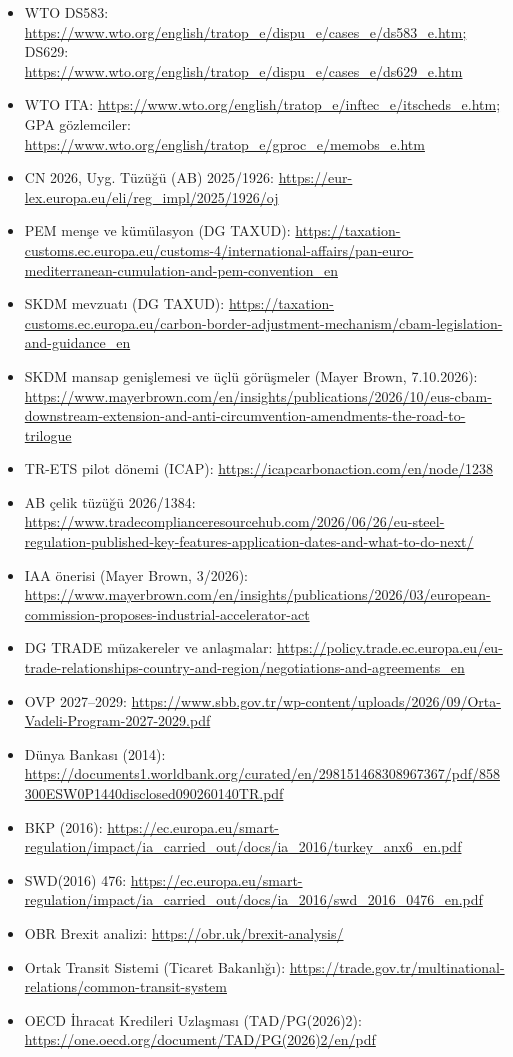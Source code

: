 \begin{itemize}
\item
  WTO DS583: \url{https://www.wto.org/english/tratop_e/dispu_e/cases_e/ds583_e.htm;} DS629: \url{https://www.wto.org/english/tratop_e/dispu_e/cases_e/ds629_e.htm}
\item
  WTO ITA: \url{https://www.wto.org/english/tratop_e/inftec_e/itscheds_e.htm;} GPA gözlemciler: \url{https://www.wto.org/english/tratop_e/gproc_e/memobs_e.htm}
\item
  CN 2026, Uyg. Tüzüğü (AB) 2025/1926: \url{https://eur-lex.europa.eu/eli/reg_impl/2025/1926/oj}
\item
  PEM menşe ve kümülasyon (DG TAXUD): \url{https://taxation-customs.ec.europa.eu/customs-4/international-affairs/pan-euro-mediterranean-cumulation-and-pem-convention_en}
\item
  SKDM mevzuatı (DG TAXUD): \url{https://taxation-customs.ec.europa.eu/carbon-border-adjustment-mechanism/cbam-legislation-and-guidance_en}
\item
  SKDM mansap genişlemesi ve üçlü görüşmeler (Mayer Brown, 7.10.2026): \url{https://www.mayerbrown.com/en/insights/publications/2026/10/eus-cbam-downstream-extension-and-anti-circumvention-amendments-the-road-to-trilogue}
\item
  TR-ETS pilot dönemi (ICAP): \url{https://icapcarbonaction.com/en/node/1238}
\item
  AB çelik tüzüğü 2026/1384: \url{https://www.tradecomplianceresourcehub.com/2026/06/26/eu-steel-regulation-published-key-features-application-dates-and-what-to-do-next/}
\item
  IAA önerisi (Mayer Brown, 3/2026): \url{https://www.mayerbrown.com/en/insights/publications/2026/03/european-commission-proposes-industrial-accelerator-act}
\item
  DG TRADE müzakereler ve anlaşmalar: \url{https://policy.trade.ec.europa.eu/eu-trade-relationships-country-and-region/negotiations-and-agreements_en}
\item
  OVP 2027--2029: \url{https://www.sbb.gov.tr/wp-content/uploads/2026/09/Orta-Vadeli-Program-2027-2029.pdf}
\item
  Dünya Bankası (2014): \url{https://documents1.worldbank.org/curated/en/298151468308967367/pdf/858300ESW0P1440disclosed090260140TR.pdf}
\item
  BKP (2016): \url{https://ec.europa.eu/smart-regulation/impact/ia_carried_out/docs/ia_2016/turkey_anx6_en.pdf}
\item
  SWD(2016) 476: \url{https://ec.europa.eu/smart-regulation/impact/ia_carried_out/docs/ia_2016/swd_2016_0476_en.pdf}
\item
  OBR Brexit analizi: \url{https://obr.uk/brexit-analysis/}
\item
  Ortak Transit Sistemi (Ticaret Bakanlığı): \url{https://trade.gov.tr/multinational-relations/common-transit-system}
\item
  OECD İhracat Kredileri Uzlaşması (TAD/PG(2026)2): \url{https://one.oecd.org/document/TAD/PG(2026)2/en/pdf}
\end{itemize}
